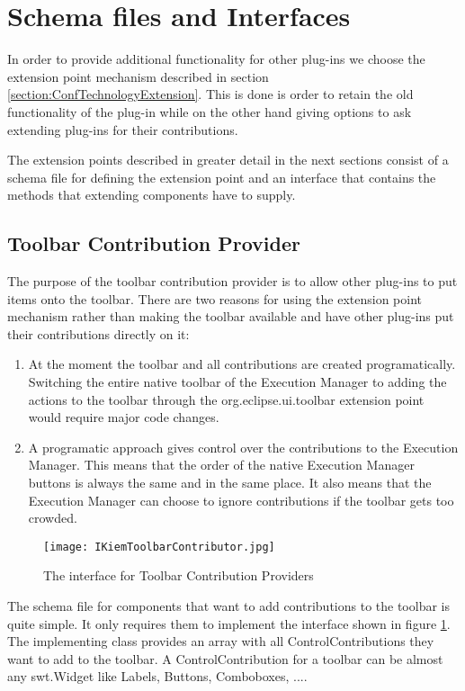 \section{Schema files and Interfaces}
In order to provide additional functionality for other plug-ins we choose the extension
point mechanism described in section \ref{section:ConfTechnologyExtension}. This is done
is order to retain the old functionality of the plug-in while on the other hand giving
options to ask extending plug-ins for their contributions. 

The extension points described in greater detail in the next sections consist
of a schema file for defining the extension point and an interface that contains the 
methods that extending components have to supply.

\subsection{Toolbar Contribution Provider}
\label{section:ToolbarContributionProvider}
The purpose of the toolbar contribution provider is to allow other plug-ins to put
items onto the toolbar. 
There are two reasons for using the extension point mechanism
rather than making the toolbar available and have other plug-ins put their
contributions directly on it:
\begin{enumerate}
 \item At the moment the toolbar and all contributions are created programatically. Switching
the entire native toolbar of the Execution Manager to adding the actions to the toolbar
through the org.eclipse.ui.toolbar extension point would require major code changes.
 \item A programatic approach gives control over the contributions to the Execution Manager.
This means that the order of the native Execution Manager buttons is always the same and in the
same place. It also means that the Execution Manager can choose to ignore contributions if the
toolbar gets too crowded.
\end{enumerate}
\begin{figure}[IToolbarContributor]
  \centering
  \texttt{[image: IKiemToolbarContributor.jpg]}
  \caption[The interface for Toolbar Contribution Providers]%
  {The interface for Toolbar Contribution Providers\protect\footnotemark}
  \label{fig:IToolbarContributor}
\end{figure}

The schema file for components that want to add contributions to the toolbar is quite simple.
It only requires them to implement the interface shown in figure \ref{fig:IToolbarContributor}.
The implementing class provides an array with all ControlContributions they want to add to the toolbar.
A ControlContribution for a toolbar can be almost any swt.Widget like Labels, Buttons, Comboboxes, ....

